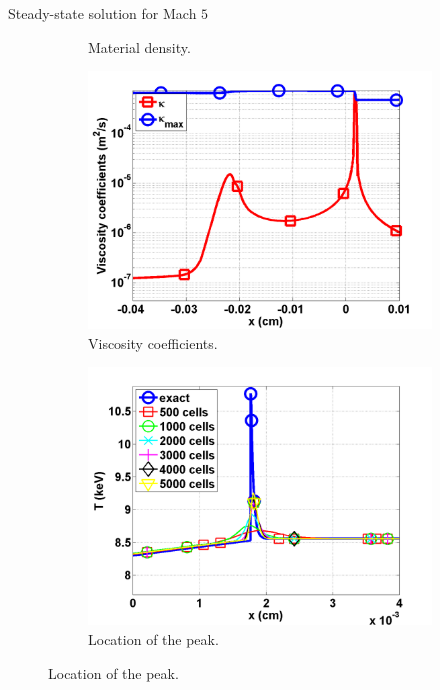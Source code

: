 \documentclass[xcolor=dvipsnames,10pt]{beamer}
\begin{document}
\begin{frame}{Steady-state solution for Mach $5$}
\begin{figure}
\begin{subfigure}[b]{0.35\textwidth}
        \caption{Material density.}
\end{subfigure}

\begin{subfigure}[b]{0.35\textwidth}
                \centering
                \includegraphics[width=\textwidth]{../figures/Mach_5_nel_2000_viscosity.png}
        \caption{Viscosity coefficients.}
\end{subfigure}
\begin{subfigure}[b]{0.35\textwidth}
                \centering
                \includegraphics[width=\textwidth]{../figures/Mach_5_comparison.png}
        \caption{Location of the peak.}
\end{subfigure}
\end{figure}


\end{frame}
\end{document}
